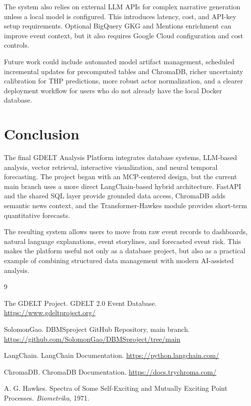 \documentclass[11pt]{article}
\begin{document}
The system also relies on external LLM APIs for complex narrative generation unless a local model is configured. This introduces latency, cost, and API-key setup requirements. Optional BigQuery GKG and Mentions enrichment can improve event context, but it also requires Google Cloud configuration and cost controls.

Future work could include automated model artifact management, scheduled incremental updates for precomputed tables and ChromaDB, richer uncertainty calibration for THP predictions, more robust actor normalization, and a clearer deployment workflow for users who do not already have the local Docker database.

\section{Conclusion}

The final GDELT Analysis Platform integrates database systems, LLM-based analysis, vector retrieval, interactive visualization, and neural temporal forecasting. The project began with an MCP-centered design, but the current main branch uses a more direct LangChain-based hybrid architecture. FastAPI and the shared SQL layer provide grounded data access, ChromaDB adds semantic news context, and the Transformer-Hawkes module provides short-term quantitative forecasts.

The resulting system allows users to move from raw event records to dashboards, natural language explanations, event storylines, and forecasted event risk. This makes the platform useful not only as a database project, but also as a practical example of combining structured data management with modern AI-assisted analysis.

\begin{thebibliography}{9}

The GDELT Project.
\newblock GDELT 2.0 Event Database.
\newblock \url{https://www.gdeltproject.org/}

SolomonGao.
\newblock DBMSproject GitHub Repository, main branch.
\newblock \url{https://github.com/SolomonGao/DBMSproject/tree/main}

LangChain.
\newblock LangChain Documentation.
\newblock \url{https://python.langchain.com/}

ChromaDB.
\newblock ChromaDB Documentation.
\newblock \url{https://docs.trychroma.com/}

A. G. Hawkes.
\newblock Spectra of Some Self-Exciting and Mutually Exciting Point Processes.
\newblock \emph{Biometrika}, 1971.

\end{thebibliography}
\end{document}
